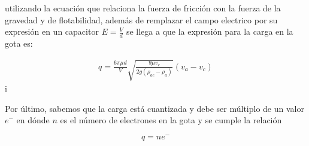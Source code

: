 utilizando la ecuación que relaciona la fuerza de fricción con la fuerza de la gravedad y de flotabilidad, además de remplazar el campo electrico por su expresión en un capacitor $E=\frac{V}{d}$ se llega a que la expresión para la carga en la gota es:

\begin{equation}
    \begin{split}
        q=\frac{6\pi \mu d}{V}\sqrt{\frac{9\mu v_c}{2g(\rho_{ac}-\rho_a)}}(v_a-v_c)
    \end{split}
\end{equation}i

Por último, sabemos que la carga está cuantizada y debe ser múltiplo de un valor $e^-$ en dónde $n$ es el número de electrones en la gota y se cumple la relación

\begin{equation}
    q=ne^-
\end{equation}
